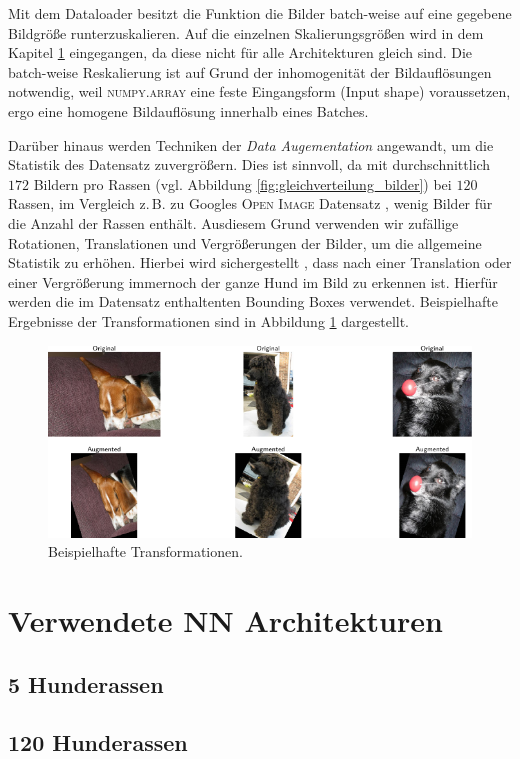 Mit dem Dataloader besitzt die Funktion die Bilder batch-weise auf eine gegebene
Bildgröße runterzuskalieren. Auf die einzelnen Skalierungsgrößen wird in dem
Kapitel \ref{sec:NNarchitekturen} eingegangen, da diese nicht für alle Architekturen
gleich sind. Die batch-weise Reskalierung ist auf Grund der inhomogenität
der Bildauflösungen notwendig, weil \textsc{numpy.array}
eine feste Eingangsform (Input shape) voraussetzen, ergo eine homogene Bildauflösung
innerhalb eines Batches.

Darüber hinaus werden Techniken der \emph{Data Augementation} angewandt, um
die Statistik des Datensatz zuvergrößern. Dies ist sinnvoll, da mit durchschnittlich
$172$ Bildern pro Rassen (vgl. Abbildung \ref{fig:gleichverteilung_bilder})
bei $120$ Rassen, im Vergleich z.\,B. zu Googles \textsc{Open Image} Datensatz
\cite{google_open_image}, wenig Bilder für die Anzahl der Rassen enthält.
Ausdiesem Grund verwenden wir zufällige Rotationen, Translationen und Vergrößerungen
der Bilder, um die allgemeine Statistik zu erhöhen. Hierbei wird sichergestellt
, dass nach einer Translation oder einer Vergrößerung immernoch der ganze Hund
im Bild zu erkennen ist. Hierfür werden die im Datensatz enthaltenten Bounding
Boxes verwendet. Beispielhafte Ergebnisse der Transformationen sind in Abbildung
\ref{fig:data_augementation} dargestellt.
\begin{figure}
\centering
\includegraphics[width=\the\textwidth]{../../final_data/general/data_augementation.pdf}
\caption{Beispielhafte Transformationen.}
\label{fig:data_augementation}
\end{figure}


\section{Verwendete NN Architekturen}\label{sec:NNarchitekturen}

\subsection{5 Hunderassen}

\subsection{120 Hunderassen}
